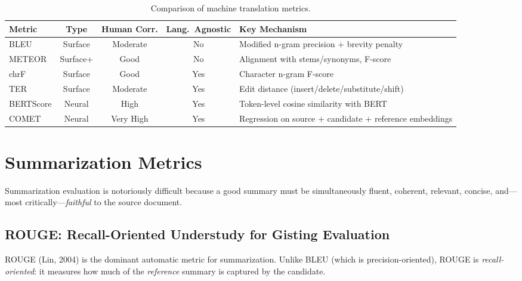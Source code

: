 \begin{table}[H]
\centering
\caption{Comparison of machine translation metrics.}
\label{tab:mt_metrics}
\begin{tabularx}{\textwidth}{@{}l c c c X@{}}
\toprule
\textbf{Metric} & \textbf{Type} & \textbf{Human Corr.} & \textbf{Lang.\ Agnostic} & \textbf{Key Mechanism} \\
\midrule
BLEU       & Surface    & Moderate  & No  & Modified n-gram precision + brevity penalty \\
METEOR     & Surface+   & Good      & No  & Alignment with stems/synonyms, F-score \\
chrF       & Surface    & Good      & Yes & Character n-gram F-score \\
TER        & Surface    & Moderate  & Yes & Edit distance (insert/delete/substitute/shift) \\
BERTScore  & Neural     & High      & Yes & Token-level cosine similarity with BERT \\
COMET      & Neural     & Very High & Yes & Regression on source + candidate + reference embeddings \\
\bottomrule
\end{tabularx}
\end{table}

\section{Summarization Metrics}
\label{sec:summarization_metrics}

Summarization evaluation is notoriously difficult because a good summary must be
simultaneously fluent, coherent, relevant, concise, and---most critically---\emph{faithful} to the source document.

\subsection{ROUGE: Recall-Oriented Understudy for Gisting Evaluation}

ROUGE (Lin, 2004) is the dominant automatic metric for summarization.  Unlike
BLEU (which is precision-oriented), ROUGE is \emph{recall-oriented}: it measures
how much of the \emph{reference} summary is captured by the candidate.

